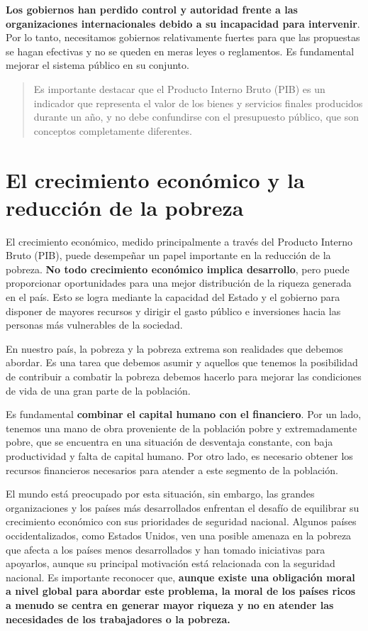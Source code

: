\documentclass[
  letterpaper,
  DIV=11,
  numbers=noendperiod]{scrartcl}
\begin{document}
\textbf{Los gobiernos han perdido control y autoridad frente a las
organizaciones internacionales debido a su incapacidad para intervenir}.
Por lo tanto, necesitamos gobiernos relativamente fuertes para que las
propuestas se hagan efectivas y no se queden en meras leyes o
reglamentos. Es fundamental mejorar el sistema público en su conjunto.

\begin{quote}
Es importante destacar que el Producto Interno Bruto (PIB) es un
indicador que representa el valor de los bienes y servicios finales
producidos durante un año, y no debe confundirse con el presupuesto
público, que son conceptos completamente diferentes.
\end{quote}

\hypertarget{el-crecimiento-econuxf3mico-y-la-reducciuxf3n-de-la-pobreza}{%
\section{El crecimiento económico y la reducción de la
pobreza}\label{el-crecimiento-econuxf3mico-y-la-reducciuxf3n-de-la-pobreza}}

El crecimiento económico, medido principalmente a través del Producto
Interno Bruto (PIB), puede desempeñar un papel importante en la
reducción de la pobreza. \textbf{No todo crecimiento económico implica
desarrollo}, pero puede proporcionar oportunidades para una mejor
distribución de la riqueza generada en el país. Esto se logra mediante
la capacidad del Estado y el gobierno para disponer de mayores recursos
y dirigir el gasto público e inversiones hacia las personas más
vulnerables de la sociedad.

En nuestro país, la pobreza y la pobreza extrema son realidades que
debemos abordar. Es una tarea que debemos asumir y aquellos que tenemos
la posibilidad de contribuir a combatir la pobreza debemos hacerlo para
mejorar las condiciones de vida de una gran parte de la población.

Es fundamental \textbf{combinar el capital humano con el financiero}.
Por un lado, tenemos una mano de obra proveniente de la población pobre
y extremadamente pobre, que se encuentra en una situación de desventaja
constante, con baja productividad y falta de capital humano. Por otro
lado, es necesario obtener los recursos financieros necesarios para
atender a este segmento de la población.

El mundo está preocupado por esta situación, sin embargo, las grandes
organizaciones y los países más desarrollados enfrentan el desafío de
equilibrar su crecimiento económico con sus prioridades de seguridad
nacional. Algunos países occidentalizados, como Estados Unidos, ven una
posible amenaza en la pobreza que afecta a los países menos
desarrollados y han tomado iniciativas para apoyarlos, aunque su
principal motivación está relacionada con la seguridad nacional. Es
importante reconocer que, \textbf{aunque existe una obligación moral a
nivel global para abordar este problema, la moral de los países ricos a
menudo se centra en generar mayor riqueza y no en atender las
necesidades de los trabajadores o la pobreza.}
\end{document}
